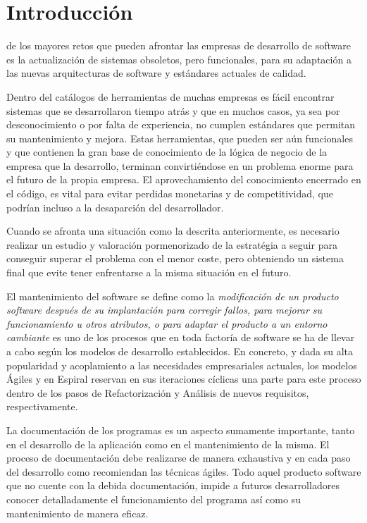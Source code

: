 \chapter{Introducción}

 de los mayores retos que pueden afrontar las empresas de desarrollo de software es la actualización de sistemas obsoletos,
pero funcionales, para su adaptación a las nuevas arquitecturas de software y estándares actuales de calidad.

Dentro del catálogos de herramientas de muchas empresas es fácil encontrar sistemas que se desarrollaron tiempo atrás y que en muchos casos, ya sea por desconocimiento
o por falta de experiencia, no cumplen estándares que permitan su mantenimiento y mejora. Estas herramientas, que pueden ser aún funcionales y que contienen 
la gran base de conocimiento de la lógica de negocio de la empresa que la desarrollo, terminan convirtiéndose en un problema enorme para el futuro de la propia empresa.
El aprovechamiento del conocimiento encerrado en el código, es vital para evitar perdidas monetarias y de competitividad, que podrían incluso a la desaparción del 
desarrollador. 

Cuando se afronta una situación como la descrita anteriormente, es necesario realizar un estudio y valoración pormenorizado de la estratégia a seguir para
conseguir superar el problema con el menor coste, pero obteniendo un sistema final que evite tener enfrentarse a la misma situación en el futuro.

El mantenimiento del software se define como la \textit{modificación de un producto software después de su implantación para corregir fallos,
para mejorar su funcionamiento u otros atributos, o para adaptar el producto a un entorno cambiante} \cite{Chikofsky1990}
es uno de los procesos que en toda factoría de software se ha de llevar a cabo según los modelos de desarrollo establecidos.
En concreto, y dada su alta popularidad y acoplamiento a las necesidades empresariales actuales, los modelos Ágiles y en Espiral 
reservan en sus iteraciones cíclicas una parte para este proceso dentro de los pasos de Refactorización y Análisis de nuevos requisitos, respectivamente.

La documentación de los programas es un aspecto sumamente importante, tanto en el desarrollo de la aplicación como en el mantenimiento de la misma. 
El proceso de documentación debe realizarse de manera exhaustiva y en cada paso del desarrollo como recomiendan las técnicas ágiles. Todo aquel producto
software que no cuente con la debida documentación, impide a futuros desarrolladores conocer detalladamente el funcionamiento del programa así como su mantenimiento
de manera eficaz. 

